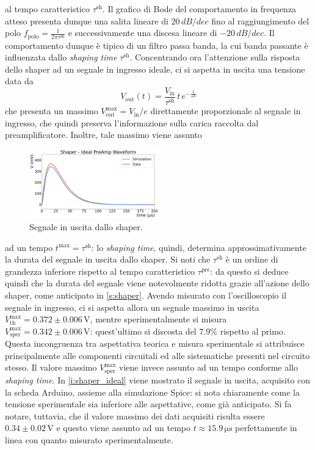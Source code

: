 \documentclass[a4paper,11pt]{article} %
\begin{document}
\noindent al tempo caratteristico $\tau^{\text{sh}}$. Il grafico di Bode del comportamento in frequenza atteso presenta
dunque una salita lineare di $20\,\si{dB/dec}$ fino al raggiungimento del polo $f_{\text{polo}}= \frac{1}{2\pi\tau^{
\text{sh} }}$ e successivamente una discesa lineare di $-20\,\si{dB/dec}$. Il comportamento dunque è tipico di un filtro
passa banda, la cui banda passante è influenzata dallo \textit{shaping time} $\tau^{ \text{sh} }$. Concentrando ora
l'attenzione sulla risposta dello shaper ad un segnale in ingresso ideale, ci si aspetta in uscita una tensione data da
\begin{equation}
	V_{\text{out}}(t)=\frac{V_{\text{in}}}{\tau^{ \text{sh} }} \, t \, e^{-\frac{t}{ \tau^{ \text{sh} } }}
\end{equation}
\noindent che presenta un massimo $V_{\text{out}}^{\text{max}}= V_{\text{in}}/e$ direttamente proporzionale al segnale
in ingresso, che quindi preserva l'informazione sulla carica raccolta dal preamplificatore. Inoltre, tale massimo viene
assunto 

\begin{figure}
	\centering
	\includegraphics[width=0.5\textwidth]{../Plots/Shaper/shaper_ideal.png}
	\caption{\small Segnale in uscita dallo shaper.}
	\label{i:shaper_ideal}
\end{figure}

\noindent ad un tempo $t^{\text{max}} = \tau^{\text{sh}}$: lo \textit{shaping time}, quindi, determina approssimativamente
la durata del segnale in uscita dallo shaper. Si noti che $\tau^{\text{sh}}$ è un ordine di grandezza inferiore rispetto
al tempo caratteristico $\tau^{\text{pre}}$: da questo si deduce quindi che la durata del segnale viene notevolmente
ridotta grazie all'azione dello shaper, come anticipato in \autoref{s:shaper}. Avendo misurato con l'oscilloscopio il
segnale in ingresso, ci si aspetta allora un segnale massimo in uscita $V_{\text{th}}^{\text{max}}= 0.372 \pm
0.006\,\si{\volt}$, mentre sperimentalmente si misura $V_{\text{sper}}^{\text{max}}= 0.342 \pm 0.006\,\si{\volt}$:
quest'ultimo si discosta del $7.9\%$ rispetto al primo. Questa incongruenza tra aspettativa teorica e misura
sperimentale si attribuisce principalmente alle componenti circuitali ed alle sistematiche presenti nel circuito stesso.
Il valore massimo $V_{\text{sper}}^{\text{max}}$ viene invece assunto ad un tempo conforme allo \textit{shaping time}.
In \autoref{i:shaper_ideal} viene mostrato il segnale in uscita, acquisito con la scheda Arduino, assieme alla
simulazione Spice: si nota chiaramente come la tensione sperimentale sia inferiore alle aspettative, come già
anticipato. Si fa notare, tuttavia, che il valore massimo dei dati acquisiti risulta essere $0.34 \pm 0.02 \,\si{\volt}$ e questo
viene assunto ad un tempo $t \approx 15.9\,\si{\us}$ perfettamente in linea con quanto misurato sperimentalmente.
\end{document}
